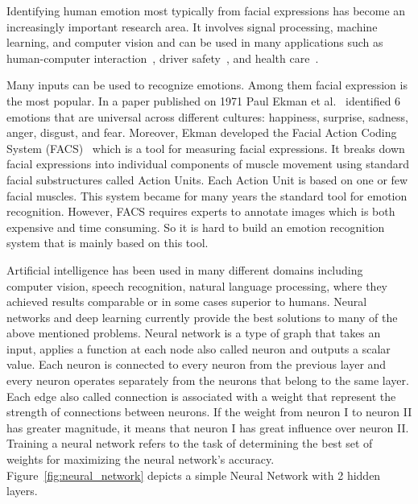 Identifying human emotion most typically from facial expressions has become an increasingly important research area. It involves signal processing, machine learning, and computer vision and can be used in many applications such as human-computer interaction~\cite{vinciarelli2009social}, driver safety~\cite{vural2008automated}, and health care~\cite{lucey2009automatically}.

Many inputs can be used to recognize emotions. Among them facial expression is the most popular. In a paper published on 1971 Paul Ekman et al.~\cite{ekman1971constants} identified 6 emotions that are universal across different cultures: happiness, surprise, sadness, anger, disgust, and fear. Moreover, Ekman developed the Facial Action Coding System (FACS)~\cite{ekman1978facial} which is a tool for measuring facial expressions. It breaks down facial expressions into  individual components of muscle movement using standard facial substructures called Action Units. Each Action Unit is based on one or few facial muscles. This system became for many years the standard tool for emotion recognition. However, FACS requires experts to annotate images which is both expensive and time consuming. So it is hard to build an emotion recognition system that is mainly based on this tool.

Artificial intelligence has been used in many different domains including computer vision, speech recognition, natural language processing, where they achieved results comparable or in some cases superior to humans. Neural networks and deep learning currently provide the best solutions to many of the above mentioned problems. Neural network is a type of graph that takes an input, applies a function at each node also called neuron and outputs a scalar value. Each neuron is connected to every neuron from the previous layer and every neuron operates separately from the neurons that belong to the same layer. Each edge also called connection is associated with a weight that represent the strength of connections between neurons. If the weight from neuron I to neuron II has greater magnitude, it means that neuron I has great influence over neuron II. Training a neural network refers to the task of determining the best set of weights for maximizing the neural network's accuracy. Figure~\ref{fig:neural_network} depicts a simple Neural Network with 2 hidden layers.

